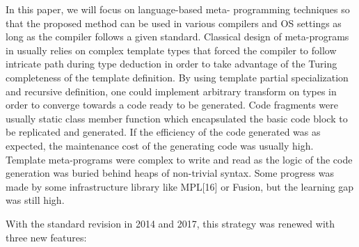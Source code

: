 \documentclass[../../main.tex]{subfiles}
\begin{document}
In this paper, we will focus on language-based meta-
programming techniques so that the proposed method can
be used in various compilers and OS settings as long as the
compiler follows a given standard.
Classical design of meta-programs in \cpp usually relies
on complex template types that forced the compiler to follow
intricate path during type deduction in order to take advantage
of the Turing completeness of the template definition. By
using template partial specialization and recursive definition,
one could implement arbitrary transform on types in order
to converge towards a code ready to be generated. Code
fragments were usually static class member function which
encapsulated the basic code block to be replicated and
generated. If the efficiency of the code generated was as
expected, the maintenance cost of the generating code was
usually high. Template meta-programs were complex to write
and read as the logic of the code generation was buried
behind heaps of non-trivial syntax. Some progress was made
by some infrastructure library like MPL[16] or Fusion, but
the learning gap was still high.

With the standard \cpp revision in 2014 and 2017, this
strategy was renewed with three new \cpp features:
\end{document}
